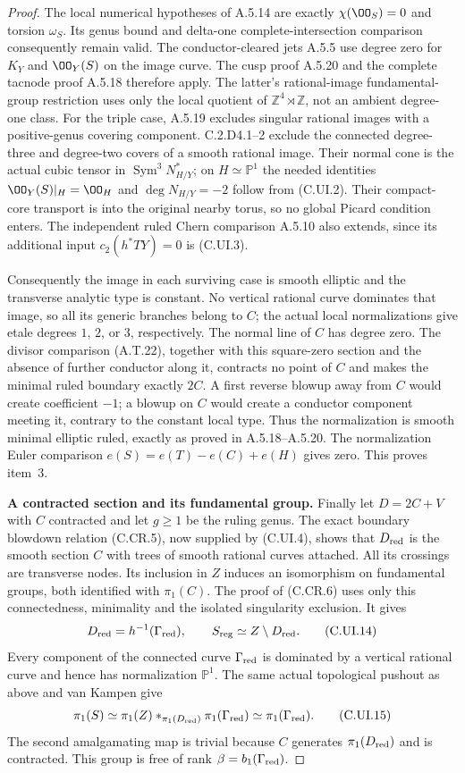 \begin{proof}
The local numerical hypotheses of A.5.14 are
exactly $\chi(\OO_S)=0$ and torsion $\omega_S$.
Its genus bound and delta-one complete-intersection
comparison consequently remain valid. The
conductor-cleared jets A.5.5 use degree zero for
$K_Y$ and $\OO_Y(S)$ on the image curve.
The cusp proof A.5.20 and the complete tacnode
proof A.5.18 therefore apply. The latter's
rational-image fundamental-group restriction
uses only the local quotient of
$\mathbb Z^4\rtimes\mathbb Z$, not an ambient
degree-one class. For the triple case, A.5.19
excludes singular rational images with a
positive-genus covering component. C.2.D4.1--2
exclude the connected degree-three and degree-two
covers of a smooth rational image. Their normal
cone is the actual cubic tensor in
$\operatorname{Sym}^3N_{H/Y}^*$; on
$H\simeq\mathbb P^1$ the needed identities
$\OO_Y(S)|_H=\OO_H$ and $\deg N_{H/Y}=-2$
follow from (C.UI.2). Their compact-core
transport is into the original nearby torus,
so no global Picard condition enters. The
independent ruled Chern comparison A.5.10 also
extends, since its additional input
$c_2(h^*TY)=0$ is (C.UI.3).

Consequently the image in each surviving case
is smooth elliptic and the transverse analytic
type is constant. No vertical rational curve
dominates that image, so all its generic
branches belong to $C$; the actual local
normalizations give etale degrees $1$, $2$,
or $3$, respectively. The normal line of $C$
has degree zero. The divisor comparison
(A.T.22), together with this square-zero
section and the absence of further conductor
along it, contracts no point of $C$ and makes
the minimal ruled boundary exactly $2C$.
A first reverse blowup away from $C$ would
create coefficient $-1$; a blowup on $C$
would create a conductor component meeting
it, contrary to the constant local type.
Thus the normalization is smooth minimal
elliptic ruled, exactly as proved in
A.5.18--A.5.20. The normalization Euler
comparison $e(S)=e(T)-e(C)+e(H)$ gives zero.
This proves item~3.

\par\medskip\noindent\textbf{A contracted section and its fundamental group.}\quad
Finally let $D=2C+V$ with $C$ contracted and
let $g\ge1$ be the ruling genus. The exact
boundary blowdown relation (C.CR.5), now
supplied by (C.UI.4), shows that $D_{\rm red}$
is the smooth section $C$ with trees of smooth
rational curves attached. All its crossings
are transverse nodes. Its inclusion in $Z$
induces an isomorphism on fundamental groups,
both identified with $\pi_1(C)$.
The proof of (C.CR.6) uses only this
connectedness, minimality and the isolated
singularity exclusion. It gives
\[
 D_{\rm red}=h^{-1}(\Gamma_{\rm red}),\qquad
 S_{\rm reg}\simeq Z\setminus D_{\rm red}.
 \tag{C.UI.14}
\]
Every component of the connected curve
$\Gamma_{\rm red}$ is dominated by a vertical
rational curve and hence has normalization
$\mathbb P^1$. The same actual topological
pushout as above and van Kampen give
\[
 \pi_1(S)\simeq
 \pi_1(Z)*_{\pi_1(D_{\rm red})}\pi_1(\Gamma_{\rm red})
 \simeq\pi_1(\Gamma_{\rm red}).
 \tag{C.UI.15}
\]
The second amalgamating map is trivial because
$C$ generates $\pi_1(D_{\rm red})$ and is
contracted. This group is free of rank
$\beta=b_1(\Gamma_{\rm red})$.


\end{proof}
